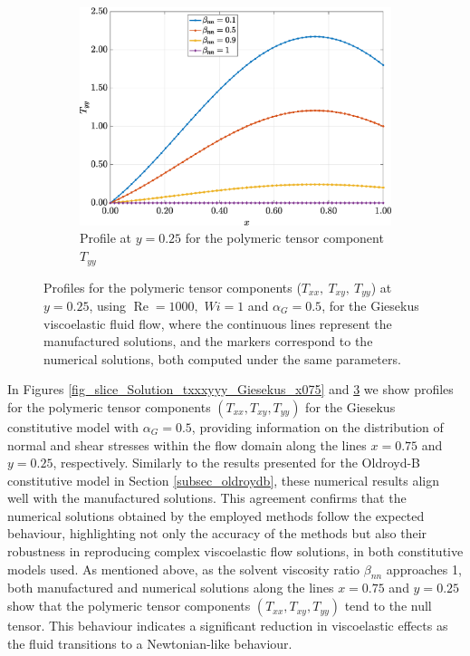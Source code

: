 \documentclass[preprint, 12pt]{elsarticle}
\begin{document}
\begin{figure}[H]
\begin{subfigure}[b]{.46\textwidth}
        \label{fig_slice_y_txy_2nd_Case1_giesekus_y025}
    \end{subfigure}
    \begin{subfigure}[b]{.46\textwidth}
        \includegraphics[width=\textwidth]{Slice_y_Tog_Numerical_NormErr_2nd_Betann_1_Re_1000_Wi_1_epsilon_0_xi_0_alphaG_0.5_Dt_1e-06_at_0.05_tipsim_1_MMS_12_x0.25y0.25_Tyy.eps}
        \caption{Profile at $y=0.25$ for the polymeric tensor component $T_{yy}$}
        \label{fig_slice_y_tyy_2nd_Case1_giesekus_y025}
    \end{subfigure}
    \vspace{0.02cm}
    \caption{Profiles for the polymeric tensor components ($T_{xx},~T_{xy},~T_{yy}$) at $y=0.25$, using $\operatorname{Re}=1000,$ $Wi=1$ and $\alpha_{G} = 0.5$, for the Giesekus viscoelastic fluid flow, where the continuous lines represent the manufactured solutions, and the markers correspond to the numerical solutions, both computed under the same parameters.\label{fig_slice_Solution_txxxyyy_Giesekus_y025}}
\end{figure}

In Figures \ref{fig_slice_Solution_txxxyyy_Giesekus_x075} and \ref{fig_slice_Solution_txxxyyy_Giesekus_y025} we show profiles for the polymeric tensor components $(T_{xx}, T_{xy}, T_{yy})$ for the Giesekus constitutive model with $\alpha_G = 0.5$, providing information on the distribution of normal and shear stresses within the flow domain along the lines $x=0.75$ and $y=0.25$, respectively. Similarly to the results presented for the Oldroyd-B constitutive model in Section \ref{subsec_oldroydb}, these numerical results align well with the manufactured solutions. This agreement confirms that the numerical solutions obtained by the employed methods follow the expected behaviour, highlighting not only the accuracy of the methods but also their robustness in reproducing complex viscoelastic flow solutions, in both constitutive models used. As mentioned above, as the solvent viscosity ratio $\beta_{nn}$ approaches 1, both manufactured and numerical solutions along the lines $x=0.75$ and \mbox{$y=0.25$} show that the polymeric tensor components $(T_{xx}, T_{xy}, T_{yy})$ tend to the null tensor. This behaviour indicates a significant reduction in viscoelastic effects as the fluid transitions to a Newtonian-like behaviour. 
\end{document}
